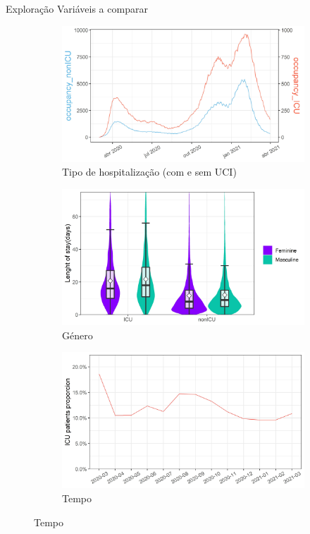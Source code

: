 \documentclass[pdf]
{beamer}
\begin{document}
\begin{frame}{Exploração}
\vspace{0.4cm}
\alert{\large Variáveis a comparar}
\begin{figure}
\centering
\begin{subfigure}{0.3\textwidth}
\caption*{Tipo de hospitalização (com e sem UCI)}
\vspace{-0.4cm}
\includegraphics[width=\textwidth]{Imagens/byDayPlot_inHosp.jpeg}
\end{subfigure}
\begin{subfigure}{0.3\textwidth}
\caption*{Género}
\vspace{-0.4cm}
\includegraphics[width=\textwidth]{Imagens/violinBox_Gender.jpeg}
\end{subfigure}
\begin{subfigure}{0.3\textwidth}
\caption*{Tempo}
\vspace{-0.4cm}
\includegraphics[width=\textwidth]{Imagens/PopVarPlot_PropICU.jpeg}

\end{subfigure}
\end{figure}
\end{frame}
\end{document}
